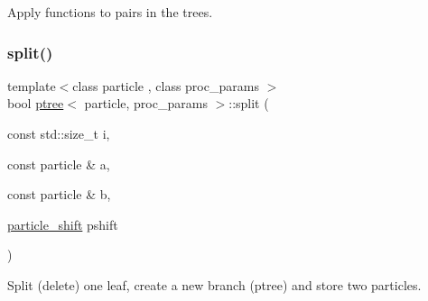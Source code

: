 Apply functions to pairs in the trees. 

\hypertarget{classptree_ae4c20eddf5cfcf45e5f809567c967bf9}{}\label{classptree_ae4c20eddf5cfcf45e5f809567c967bf9} 
\subsubsection{\texorpdfstring{split()}{split()}}
{\footnotesize\ttfamily template$<$class particle , class proc\+\_\+params $>$ \\
bool \hyperlink{classptree}{ptree}$<$ particle, proc\+\_\+params $>$\+::split (\begin{DoxyParamCaption}\item[{const std\+::size\+\_\+t}]{i,  }\item[{const particle \&}]{a,  }\item[{const particle \&}]{b,  }\item[{\hyperlink{classptree_abbd858cc881219618a3ac42f3df11cc6}{particle\+\_\+shift}}]{pshift }\end{DoxyParamCaption})\hspace{0.3cm}{\ttfamily [inline]}}



Split (delete) one leaf, create a new branch (ptree) and store two particles. 


